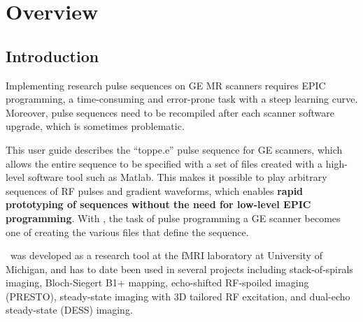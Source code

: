 

\chapter{Overview}
\setcounter{page}{1}

\section{Introduction}
Implementing research pulse sequences on GE MR scanners requires EPIC programming, a time-consuming and error-prone task with a steep learning curve.
Moreover, pulse sequences need to be recompiled after each scanner software upgrade, which is sometimes problematic.

This user guide describes the ``toppe.e'' pulse sequence for GE scanners, which allows the entire sequence to be specified with a set of files created with a high-level software tool such as Matlab.
This makes it possible to play arbitrary sequences of RF pulses and gradient waveforms, which enables \textbf{rapid prototyping of sequences without the need for low-level EPIC programming}.
With \toppe, the task of pulse programming a GE scanner becomes one of creating the various files that define the sequence.


\toppe~was developed as a research tool at the fMRI laboratory at University of Michigan, and has to date been used in several projects including stack-of-spirals imaging, Bloch-Siegert B1+ mapping, echo-shifted RF-spoiled imaging (PRESTO), steady-state imaging with 3D tailored RF excitation, and dual-echo steady-state (DESS) imaging.

